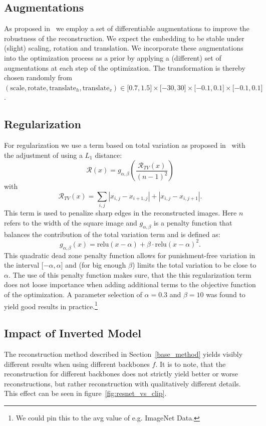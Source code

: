 \documentclass[10pt,twocolumn]{article}
\begin{document}
\subsection{Augmentations}\label{augs}
As proposed in~\cite{ghiasiPlugInInversionModelAgnostic2021} we employ a set of differentiable augmentations to improve the robustness of the reconstruction.
We expect the embedding to be stable under (slight) scaling, rotation and translation.
We incorporate these augmentations into the optimization process as a prior by applying a (different) set of augmentations at each step of the optimization.
The transformation is thereby chosen randomly from $(\text{scale}, \text{rotate}, \text{translate}_h, \text{translate}_v) \in \lbrack 0.7, 1.5\rbrack\times \lbrack -30, 30\rbrack \times \lbrack -0.1, 0.1\rbrack \times \lbrack -0.1, 0.1\rbrack$.

\subsection{Regularization}\label{reg}
For regularization we use a term based on total variation as proposed in~\cite{mahendranUnderstandingDeepImage2015} with the adjustment of using a $L_1$ distance:
$$
\mathcal{R}(x) = g_{\alpha,\beta}\left(\dfrac{\mathcal{R}_{TV}(x)}{(n-1)^2}\right)
$$
with
$$
\mathcal{R}_{TV}(x) = \sum_{i,j} \left| x_{i,j} - x_{i + 1,j} \right| + \left| x_{i,j} - x_{i,j + 1} \right|.
$$
This term is used to penalize sharp edges in the reconstructed images.
Here $n$ refers to the width of the square image and $g_{\alpha,\beta}$ is a penalty function that balances the contribution of the total variation term and is defined as:
$$
g_{\alpha,\beta}(x) = \text{relu}(x - \alpha) + \beta\cdot\text{relu}(x - \alpha) ^ 2.
$$
This quadratic dead zone penalty function allows for punishment-free variation in the interval $\lbrack-\alpha,\alpha\rbrack$ and (for big enough $\beta$) limits the total variation to be close to $\alpha$.
The use of this penalty function makes sure, that the this regularization term does not loose importance when adding additional terms to the objective function of the optimization.
A parameter selection of $\alpha = 0.3$ and $\beta = 10$ was found to yield good results in practice.\footnote{We could pin this to the avg value of e.g. ImageNet Data.}

\subsection{Impact of Inverted Model}
The reconstruction method described in Section~\ref{base_method} yields visibly different results when using different backbones $f$.
It is to note, that the reconstruction for different backbones does not strictly yield better or worse reconstructions, but rather reconstruction with qualitatively different details.
This effect can be seen in figure~\ref{fig:resnet_vs_clip}.
\end{document}
